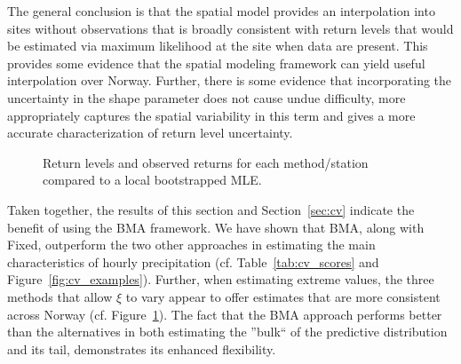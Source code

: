 \documentclass[11pt,english]{article}
\begin{document}
The general conclusion is that the spatial model provides an interpolation into sites without observations that is broadly consistent with return levels that would be estimated via maximum likelihood at the site when data are present.  This provides some evidence that the spatial modeling framework can yield useful interpolation over Norway.  Further, there is some evidence that incorporating the uncertainty in the shape parameter does not cause undue difficulty, more appropriately captures the spatial variability in this term and gives a more accurate characterization of return level uncertainty.
\begin{figure}
\begin{center}
\end{center}
\caption{Return levels and observed returns for each method/station compared to a local bootstrapped MLE.}\label{fig:returns}
\end{figure}

Taken together, the results of this section and Section~\ref{sec:cv} indicate the benefit of using the BMA framework. We have shown that BMA, along with Fixed, outperform the two other approaches in estimating the main characteristics of hourly precipitation (cf. Table~\ref{tab:cv_scores} and Figure~\ref{fig:cv_examples}). Further, when estimating extreme values, the three methods that allow $\xi$ to vary appear to offer estimates that are more consistent across Norway (cf. Figure~\ref{fig:returns}). The fact that the BMA approach performs better than the alternatives in both estimating the ''bulk`` of the predictive distribution and its tail, demonstrates its enhanced flexibility.
\end{document}
